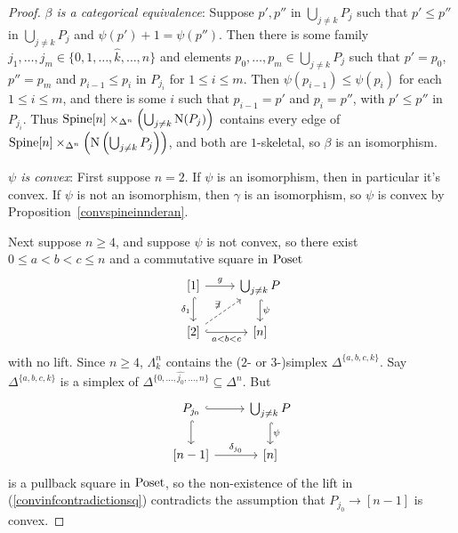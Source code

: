 \documentclass{tac}
\newcommand{\tx}[1]{\textnormal{#1}}
\begin{document}
\begin{proof}
\hfill

\emph{$\beta$ is a categorical equivalence}:  Suppose $p', p''$ in $ \bigcup_{j\neq k} P_j$ such that $p'\leq p''$ in $ \bigcup_{j\neq k} P_j$ and $\psi (p') +1=\psi (p'')$.  Then there is some family $j_1 , \dots , j_m \in \{ 0, 1,\dots , \widehat{k} , \dots ,n \}$ and elements $p_{0}, \dots , p_m \in \bigcup_{j\neq k} P_j$ such that $p' =p_{0}$, $p'' = p_{m}$ and $p_{i-1} \leq p_{i}$ in $P_{j_i}$ for $1\leq i \leq m$.  Then $\psi (p_{i-1}) \leq \psi (p_i)$ for each $1\leq i\leq m$, and there is some $i$ such that $p_{i-1} = p'$ and $p_{i} = p''$, with $p' \leq p''$ in $P_{j_i}$.  Thus $\tx{Spine}[n] \times_{\Delta^n} \left( \bigcup_{j\neq k} \tx{N}(P_j) \right)$ contains every edge of $\tx{Spine}[n] \times_{\Delta^n} \left( \tx{N}\left( \bigcup_{j\neq k} P_j \right) \right)$, and both are $1$-skeletal, so $\beta$ is an isomorphism.

\hfill

\emph{$\psi$ is convex}:  First suppose $n=2$.  If $\psi$ is an isomorphism, then in particular it's convex.  If $\psi$ is not an isomorphism, then $\gamma$ is an isomorphism, so $\psi$ is convex by Proposition~\ref{convspineinnderan}.

Next suppose $n\geq 4$, and suppose $\psi$ is not convex, so there exist $0\leq a < b < c \leq n$ and a commutative square in $\tx{Poset}$
\begin{equation}\label{convinfcontradictionsq}\begin{tikzcd}
{[1]} \arrow[]{r}{g} \arrow[hook]{d}[swap]{\delta_1} & \bigcup_{j\neq k} P \arrow[hook]{d}{\psi} \\
{[2]} \arrow[dashed]{ur}{\not\exists} \arrow[hook]{r}[swap]{a<b<c} & {[n]}
\end{tikzcd}\end{equation}
with no lift.  Since $n\geq 4$, $\Lambda^n_k$ contains the ($2$- or $3$-)simplex $\Delta^{\{a,b,c,k\}}$.  Say $\Delta^{\{a,b,c,k\}}$ is a simplex of $ \Delta^{\{ 0 , \dots, \widehat{j_0} , \dots , n \}} \subseteq \Delta^n$.   But 
\[\begin{tikzcd}
P_{j_0}\arrow[hook]{d} \arrow[hook]{r} & \bigcup_{j\neq k} P \arrow[hook]{d}{\psi} \\
{[n-1] } \arrow[]{r}{\delta_{j_0}}& {[n]}
\end{tikzcd}\]
is a pullback square in $\tx{Poset}$, so the non-existence of the lift in (\ref{convinfcontradictionsq}) contradicts the assumption that $P_{j_0} \to [n-1]$ is convex.


\end{proof}
\end{document}
